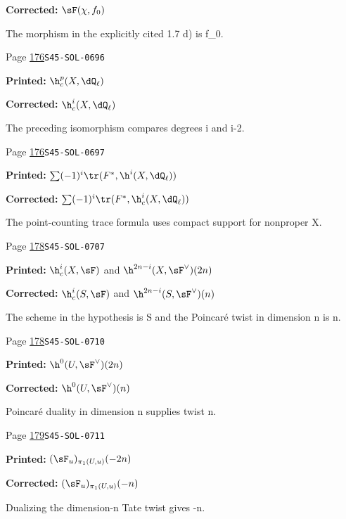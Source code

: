 \begin{description}
\par\noindent\textbf{Corrected:} \(\sF(\chi,f_0)\)
\par\noindent The morphism in the explicitly cited 1.7 d) is f\_0.
\smallskip
\item[\hypertarget{apparatus:EN-0099}{99}] Page \hyperlink{printpage:en:176}{176}\quad\texttt{S45-SOL-0696}
\par\noindent\textbf{Printed:} \(\h_c^p(X,\dQ_\ell)\)
\par\noindent\textbf{Corrected:} \(\h_c^i(X,\dQ_\ell)\)
\par\noindent The preceding isomorphism compares degrees i and i-2.
\smallskip
\item[\hypertarget{apparatus:EN-0100}{100}] Page \hyperlink{printpage:en:176}{176}\quad\texttt{S45-SOL-0697}
\par\noindent\textbf{Printed:} \(\sum (-1)^i \tr(F^\ast,\h^i(X,\dQ_\ell))\)
\par\noindent\textbf{Corrected:} \(\sum (-1)^i \tr(F^\ast,\h_c^i(X,\dQ_\ell))\)
\par\noindent The point-counting trace formula uses compact support for nonproper X.
\smallskip
\item[\hypertarget{apparatus:EN-0101}{101}] Page \hyperlink{printpage:en:178}{178}\quad\texttt{S45-SOL-0707}
\par\noindent\textbf{Printed:} $\h_c^i(X,\sF)$ and $\h^{2n-i}(X,\sF^\vee)(2n)$
\par\noindent\textbf{Corrected:} $\h_c^i(S,\sF)$ and $\h^{2n-i}(S,\sF^\vee)(n)$
\par\noindent The scheme in the hypothesis is S and the Poincaré twist in dimension n is n.
\smallskip
\item[\hypertarget{apparatus:EN-0102}{102}] Page \hyperlink{printpage:en:178}{178}\quad\texttt{S45-SOL-0710}
\par\noindent\textbf{Printed:} \(\h^0(U,\sF^\vee)(2n)\)
\par\noindent\textbf{Corrected:} \(\h^0(U,\sF^\vee)(n)\)
\par\noindent Poincaré duality in dimension n supplies twist n.
\smallskip
\item[\hypertarget{apparatus:EN-0103}{103}] Page \hyperlink{printpage:en:179}{179}\quad\texttt{S45-SOL-0711}
\par\noindent\textbf{Printed:} \((\sF_u)_{\pi_1(U,u)}(-2n)\)
\par\noindent\textbf{Corrected:} \((\sF_u)_{\pi_1(U,u)}(-n)\)
\par\noindent Dualizing the dimension-n Tate twist gives -n.

\end{description}
